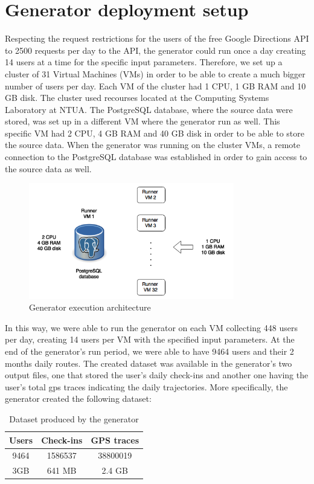 \section{Generator deployment setup}

Respecting the request restrictions for the users of the free Google Directions API to 2500 requests per day to the API, the generator could run 
once a day creating 14 users at a time for the specific input parameters. Therefore, we set up a cluster of 31 Virtual Machines (VMs) in order to be able to create a much 
bigger number of users per day. Each VM of the cluster had 1 CPU, 1 GB RAM and 10 GB disk. The cluster used recourses located at the Computing 
Systems Laboratory at NTUA. The PostgreSQL database, where the source data were stored, was set up in a different VM where the 
generator run as well. This specific VM had 2 CPU, 4 GB RAM and 40 GB disk in order to be able to store the source data. When the generator was running 
on the cluster VMs, a remote connection to the PostgreSQL database was established in order to gain access to the source data as well. 

\begin{figure}[H]
  \centering
  \includegraphics[width=0.8\textwidth]{figures/gen_arch.png}
  \caption{Generator execution architecture}
\end{figure}

In this way, we were able to run the generator on each VM collecting 448 users per day, creating 14 users per VM with the specified input parameters. 
At the end of the generator's run period, we were able to have 9464 users and their 2 months daily routes. 
The created dataset was available in the generator's two output files, one that stored the user's daily check-ins and another one having the user's total 
gps traces indicating the daily trajectories. More specifically, the generator created the following dataset: 

\begin{table}[H]
\begin{center}
\begin{tabular}{|c|c|c|}
\hline
Users & Check-ins & GPS traces \\ \hline
9464 & 1586537 & 38800019 \\ \hline
3GB & 641 MB & 2.4 GB \\ \hline
\end{tabular}
\end{center}
\caption{Dataset produced by the generator}
\end{table}


